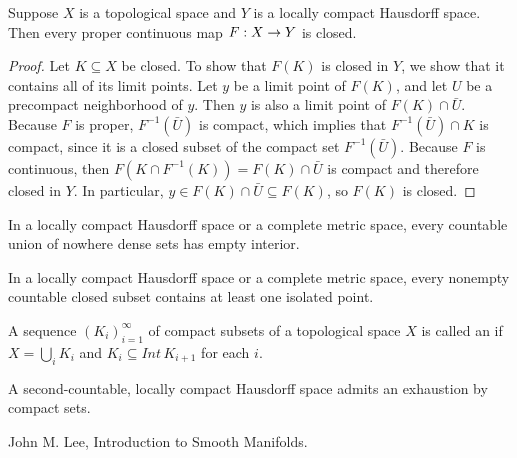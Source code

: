 \documentclass[11pt,a4paper]{article}
\begin{document}
\begin{proposition}
Suppose $X$ is a topological space and $Y$ is a locally compact Hausdorff space. Then every proper continuous map $F:X\rightarrow Y$ is closed.
\end{proposition}

\begin{proof}
Let $K\subseteq X$ be closed. To show that $F(K)$ is closed in $Y$, we show that it contains all of its limit points. Let $y$ be a limit point of $F(K)$, and let $U$ be a precompact neighborhood of $y$. Then $y$ is also a limit point of $F(K)\cap \bar{U}$. Because $F$ is proper, $F^{-1}(\bar{U})$ is compact, which implies that $F^{-1}(\bar{U})\cap K$ is compact, since it is a closed subset of the compact set $F^{-1}(\bar{U})$. Because $F$ is continuous, then $F(K\cap F^{-1}(K)) = F(K)\cap \bar{U}$ is compact and therefore closed in $Y$. In particular, $y\in F(K)\cap\bar{U}\subseteq F(K)$, so $F(K)$ is closed.
\end{proof}

\begin{proposition}
In a locally compact Hausdorff space or a complete metric space, every countable union of nowhere dense sets has empty interior.
\end{proposition}

\begin{proposition}
In a locally compact Hausdorff space or a complete metric space, every nonempty countable closed subset contains at least one isolated point.
\end{proposition}

\begin{definition}
A sequence $(K_i)_{i=1}^\infty$ of compact subsets of a topological space $X$ is called an  if $X = \bigcup_i K_i$ and $K_{i}\subseteq Int\,K_{i+1}$ for each $i$.
\end{definition}

\begin{proposition}
A second-countable, locally compact Hausdorff space admits an exhaustion by compact sets.
\end{proposition}


\begin{thebibliography}{9}
John M. Lee, Introduction to Smooth Manifolds.



\end{thebibliography}
\end{document}

